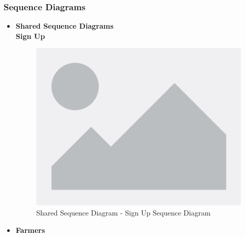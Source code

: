 \documentclass[table, 12pt]{article} %
\begin{document}
        \newpage
        \subsubsection{Sequence Diagrams} \label{sequencediagram} 
        \begin{itemize}
            \item \textbf{Shared Sequence Diagrams}\\
            
            \textbf{Sign Up}
            \begin{center}
                \begin{figure}[H]
                    \includegraphics[scale=0.55, center]{assets/placeholder.png}
                    \caption{Shared Sequence Diagram - Sign Up Sequence Diagram}
                    \label{fig: sequence_signup}
                \end{figure}
            \end{center}

            \item \textbf{Farmers}\\

           
        \end{itemize}
        \newpage
\end{document}
